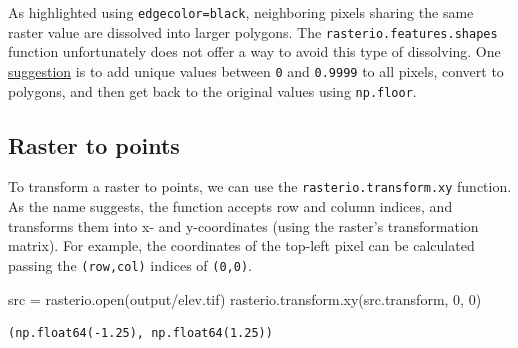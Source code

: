 \documentclass[
  letterpaper,
]{krantz}
\newenvironment{Shaded}{\begin{snugshade}}{\end{snugshade}}
\newcommand{\BuiltInTok}[1]{\textcolor[rgb]{0.00,0.23,0.31}{#1}}
\newcommand{\DecValTok}[1]{\textcolor[rgb]{0.68,0.00,0.00}{#1}}
\newcommand{\NormalTok}[1]{\textcolor[rgb]{0.00,0.23,0.31}{#1}}
\newcommand{\OperatorTok}[1]{\textcolor[rgb]{0.37,0.37,0.37}{#1}}
\newcommand{\StringTok}[1]{\textcolor[rgb]{0.13,0.47,0.30}{#1}}
\begin{document}
As highlighted using
\texttt{edgecolor=\textquotesingle{}black\textquotesingle{}},
neighboring pixels sharing the same raster value are dissolved into
larger polygons. The \texttt{rasterio.features.shapes} function
unfortunately does not offer a way to avoid this type of dissolving. One
\href{https://gis.stackexchange.com/questions/455980/vectorizing-all-pixels-as-separate-polygons-using-rasterio\#answer-456251}{suggestion}
is to add unique values between \texttt{0} and \texttt{0.9999} to all
pixels, convert to polygons, and then get back to the original values
using \texttt{np.floor}.

\subsection{Raster to points}\label{sec-raster-to-points}

To transform a raster to points, we can use the
\texttt{rasterio.transform.xy} function. As the name suggests, the
function accepts row and column indices, and transforms them into x- and
y-coordinates (using the raster's transformation matrix). For example,
the coordinates of the top-left pixel can be calculated passing the
\texttt{(row,col)} indices of \texttt{(0,0)}.

\begin{Shaded}
\begin{Highlighting}[]
\NormalTok{src }\OperatorTok{=}\NormalTok{ rasterio.}\BuiltInTok{open}\NormalTok{(}\StringTok{\textquotesingle{}output/elev.tif\textquotesingle{}}\NormalTok{)}
\NormalTok{rasterio.transform.xy(src.transform, }\DecValTok{0}\NormalTok{, }\DecValTok{0}\NormalTok{)}
\end{Highlighting}
\end{Shaded}

\begin{verbatim}
(np.float64(-1.25), np.float64(1.25))
\end{verbatim}
\end{document}
